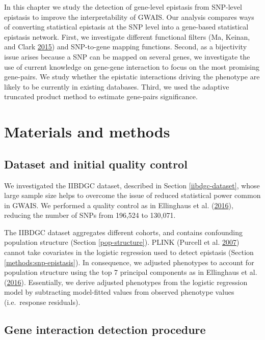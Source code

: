 \documentclass[
  11pt,
]{env/yjiao}
\begin{document}
In this chapter we study the detection of gene-level epistasis from
SNP-level epistasis to improve the interpretability of GWAIS. Our
analysis compares ways of converting statistical epistasis at the SNP
level into a gene-based statistical epistasis network. First, we
investigate different functional filters (Ma, Keinan, and Clark \protect\hyperlink{ref-ma2015biological}{2015}) and
SNP-to-gene mapping functions.
Second, as a bijectivity issue arises because a SNP can be mapped on
several genes, we investigate the use of current knowledge on gene-gene
interaction to focus on the most promising gene-pairs. We study whether
the epistatic interactions driving the phenotype are likely to be
currently in existing databases. Third, we used the adaptive truncated
product method to estimate gene-pairs significance.

\hypertarget{materials-and-methods}{%
\section{Materials and methods}\label{materials-and-methods}}

\hypertarget{snp2gene-qc}{%
\subsection{Dataset and initial quality control}\label{snp2gene-qc}}

We investigated the IIBDGC dataset, described in
Section \ref{iibdgc-dataset}, whose large sample size helps to overcome the
issue of reduced statistical power common in GWAIS.
We performed a quality control as in Ellinghaus et al. (\protect\hyperlink{ref-ellinghaus_analysis_2016}{2016}), reducing the
number of SNPs from 196,524 to 130,071.

The IIBDGC dataset aggregates different cohorts, and contains
confounding population structure (Section \ref{pop-structure}). PLINK
(Purcell et al. \protect\hyperlink{ref-purcell2007plink}{2007}) cannot take covariates in the logistic regression used to
detect epistasis (Section \ref{methods:snp-epistasis}). In consequence, we adjusted
phenotypes to account for population structure using the top 7 principal
components as in Ellinghaus et al. (\protect\hyperlink{ref-ellinghaus_analysis_2016}{2016}). Essentially, we derive adjusted
phenotypes from the logistic regression model by subtracting model-fitted
values from observed phenotype values (i.e.~response residuals).

\hypertarget{methods:pipeline}{%
\subsection{Gene interaction detection procedure}\label{methods:pipeline}}
\end{document}
